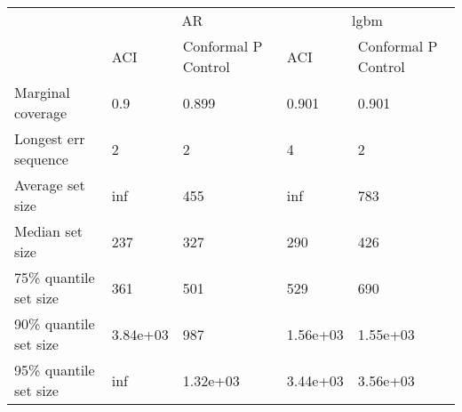 \begin{tabular}{lllll}
\toprule
& \multicolumn{2}{c}{AR}& \multicolumn{2}{c}{lgbm} \\
& ACI & Conformal P Control & ACI & Conformal P Control \\
\midrule
Marginal coverage & 0.9 & 0.899 & 0.901 & 0.901 \\
Longest err sequence & 2 & 2 & 4 & 2 \\
Average set size & inf & 455 & inf & 783 \\
Median set size & 237 & 327 & 290 & 426 \\
75\% quantile set size & 361 & 501 & 529 & 690 \\
90\% quantile set size & 3.84e+03 & 987 & 1.56e+03 & 1.55e+03 \\
95\% quantile set size & inf & 1.32e+03 & 3.44e+03 & 3.56e+03 \\
\bottomrule
\end{tabular}
